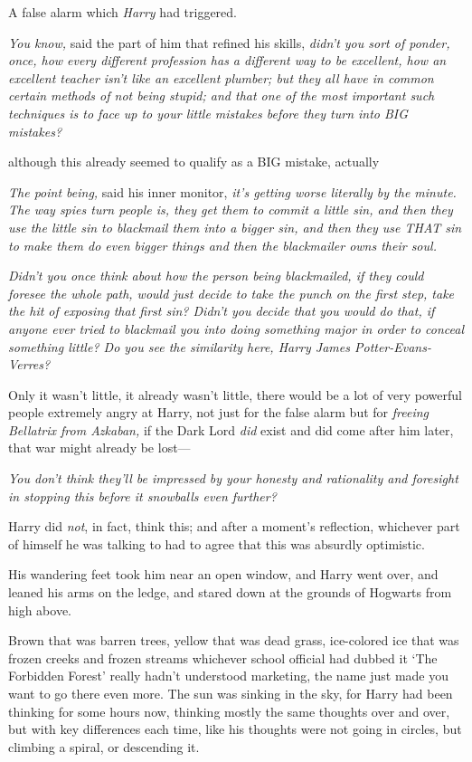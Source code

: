 A false alarm which \emph{Harry} had triggered.

\emph{You know,} said the part of him that refined his skills, \emph{didn't you
sort of ponder, once, how every different profession has a different way to be
excellent, how an excellent teacher isn't like an excellent plumber; but they
all have in common certain methods of not being stupid; and that one of the
most important such techniques is to face up to your little mistakes before
they turn into BIG mistakes?}

{\el} although this already seemed to qualify as a BIG mistake,
actually{\el}

\emph{The point being,} said his inner monitor, \emph{it's getting worse
literally by the minute. The way spies turn people is, they get them to commit
a little sin, and then they use the little sin to blackmail them into a bigger
sin, and then they use THAT sin to make them do even bigger things and then the
blackmailer owns their soul.}

\emph{Didn't you once think about how the person being blackmailed, if they
could foresee the whole path, would just decide to take the punch on the first
step, take the hit of exposing that first sin? Didn't you decide that you would
do that, if anyone ever tried to blackmail you into doing something major in
order to conceal something little? Do you see the similarity here, Harry James
Potter-Evans-Verres?}

Only it wasn't little, it already wasn't little, there would be a lot of very
powerful people extremely angry at Harry, not just for the false alarm but for
\emph{freeing Bellatrix from Azkaban,} if the Dark Lord \emph{did} exist and
did come after him later, that war might already be lost—

\emph{You don't think they'll be impressed by your honesty and rationality and
foresight in stopping this before it snowballs even further?}

Harry did \emph{not}, in fact, think this; and after a moment's reflection,
whichever part of himself he was talking to had to agree that this was
absurdly optimistic.

His wandering feet took him near an open window, and Harry went over, and
leaned his arms on the ledge, and stared down at the grounds of Hogwarts from
high above.

Brown that was barren trees, yellow that was dead grass, ice-colored ice that
was frozen creeks and frozen streams{\el} whichever school official had
dubbed it `The Forbidden Forest' really hadn't understood marketing, the name
just made you want to go there even more. The sun was sinking in the sky, for
Harry had been thinking for some hours now, thinking mostly the same thoughts
over and over, but with key differences each time, like his thoughts were not
going in circles, but climbing a spiral, or descending it.

